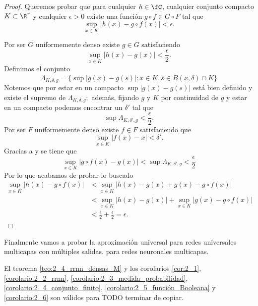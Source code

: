 \begin{proof}
    Queremos probar que para cualquier $h \in \fC$, cualquier conjunto compacto $K \subset \R^r$ 
    y cualquier $\epsilon >0$
    existe una función $g \circ f \in G \circ F$ tal que 
    \begin{equation}
        \sup_{x \in K}|h(x) - g \circ f(x)| < \epsilon.
    \end{equation}

    Por ser $G$ uniformemente denso existe $g \in G$ satisfaciendo 
    \begin{equation}
        \sup_{x \in K}|h(x) - g(x)| < \frac{\epsilon}{2}.
    \end{equation}
    Definimos el conjunto 
    \begin{equation}
        \Lambda_{K, \delta, g} 
        = 
        \{
           \sup|g(x) - g(s)| : x \in K, s \in \bar{B}(x,\delta) \cap K 
        \}
    \end{equation}
    Notemos que por estar en un compacto $\sup|g(x) - g(s)|$ está bien definido 
    y existe el supremo de $\Lambda_{K, \delta, g};$ además, fijando $g$ y $K$ por continuidad de $g$
    y estar en un compacto podemos encontrar un $\delta'$ tal que 
    \begin{equation}\label{lema_A_6:supremo_lambda_delta_prima}
        \sup \Lambda_{K, \delta', g}  < \frac{\epsilon}{2}.
    \end{equation}
    Por ser $F$ uniformemente denso existe $f \in F$ satisfaciendo 
    que 
    \begin{equation}\label{lema_A_6:encontramos_f}
        \sup_{x \in K}|f(x) - x| < \delta'.
    \end{equation}
    Gracias a  y  se tiene que
    \begin{equation}
        \sup_{x \in K}|g \circ f(x) - g(x)| 
        < \sup \Lambda_{K, \delta', g} 
        < \frac{\epsilon}{2}
    \end{equation}
    Por lo que acabamos de probar lo buscado 
    \begin{align}
        \sup_{x \in K}|h(x) - g \circ f(x)| &
        < 
        \sup_{x \in K}|h(x) - g(x) + g(x) - g \circ f(x)| 
        \\ &
        < 
        \sup_{x \in K}|h(x) - g(x)|
        + 
        \sup_{x \in K}|g(x) - g \circ f(x)|  
        \\ &
        < 
        \frac{\epsilon}{2} + \frac{\epsilon}{2}
        = \epsilon.
    \end{align}
\end{proof}

Finalmente vamos a probar la aproximación universal para redes universales multicapas con múltiples salidas. 
para redes neuronales multicapas. 
\begin{corolario}
    El teorema
    \ref{teo:2_4_rrnn_densas_M} 
    y los corolarios
    \ref{cor:2_1}, 
    \ref{corolario:2_2_rrnn},
    \ref{corolario:2_3_medida_probabilidad},
    \ref{corolario:2_4_conjunto_finito},
    \ref{corolario:2_5_función_Booleana}
    y 
    \ref{corolario:2_6}
    son válidos para 
    TODO terminar de copiar. 
\end{corolario}